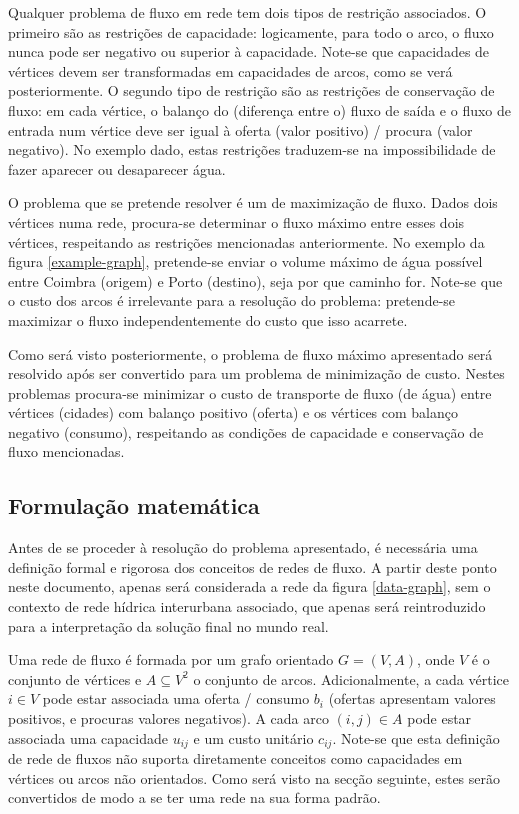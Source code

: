 \documentclass[12pt, a4paper, titlepage]{article}
\begin{document}
Qualquer problema de fluxo em rede tem dois tipos de restrição associados. O primeiro são as
restrições de capacidade: logicamente, para todo o arco, o fluxo nunca pode ser negativo ou superior
à capacidade. Note-se que capacidades de vértices devem ser transformadas em capacidades de arcos,
como se verá posteriormente. O segundo tipo de restrição são as restrições de conservação de fluxo:
em cada vértice, o balanço do (diferença entre o) fluxo de saída e o fluxo de entrada num vértice
deve ser igual à oferta (valor positivo) / procura (valor negativo). No exemplo dado, estas
restrições traduzem-se na impossibilidade de fazer aparecer ou desaparecer água.


O problema que se pretende resolver é um de maximização de fluxo. Dados dois vértices numa rede,
procura-se determinar o fluxo máximo entre esses dois vértices, respeitando as restrições
mencionadas anteriormente. No exemplo da figura \ref{example-graph}, pretende-se enviar o volume
máximo de água possível entre Coimbra (origem) e Porto (destino), seja por que caminho for. Note-se
que o custo dos arcos é irrelevante para a resolução do problema: pretende-se maximizar o fluxo
independentemente do custo que isso acarrete.

Como será visto posteriormente, o problema de fluxo máximo apresentado será resolvido após ser
convertido para um problema de minimização de custo. Nestes problemas procura-se minimizar o custo
de transporte de fluxo (de água) entre vértices (cidades) com balanço positivo (oferta) e os
vértices com balanço negativo (consumo), respeitando as condições de capacidade e conservação de
fluxo mencionadas.

\subsection{Formulação matemática}

Antes de se proceder à resolução do problema apresentado, é necessária uma definição formal e
rigorosa dos conceitos de redes de fluxo. A partir deste ponto neste documento, apenas será
considerada a rede da figura \ref{data-graph}, sem o contexto de rede hídrica interurbana associado,
que apenas será reintroduzido para a interpretação da solução final no mundo real.

Uma rede de fluxo é formada por um grafo orientado $G = (V, A)$, onde $V$ é o conjunto de vértices e
$A \subseteq V^2$ o conjunto de arcos. Adicionalmente, a cada vértice $i \in V$ pode estar associada
uma oferta / consumo $b_i$ (ofertas apresentam valores positivos, e procuras valores negativos). A
cada arco $(i, j) \in A$ pode estar associada uma capacidade $u_{i j}$ e um custo unitário
$c_{i j}$. Note-se que esta definição de rede de fluxos não suporta diretamente conceitos como
capacidades em vértices ou arcos não orientados. Como será visto na secção seguinte, estes serão
convertidos de modo a se ter uma rede na sua forma padrão.
\end{document}
